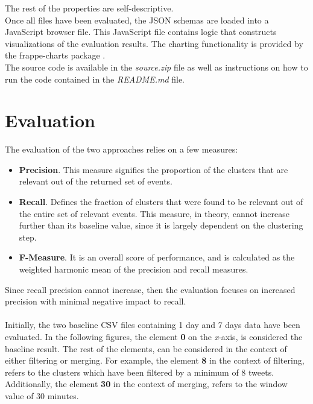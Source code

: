 \documentclass[a4paper,portrait,12pt]{article}
\begin{document}
The rest of the properties are self-descriptive.\\

Once all files have been evaluated, the JSON schemas are loaded into a JavaScript browser file.
This JavaScript file contains logic that constructs visualizations of the evaluation results.
The charting functionality is provided by the frappe-charts package \cite{frappeCharts}.\\

The source code is available in the \textit{source.zip} file as well as instructions on how to run the code contained in the \textit{README.md} file.

\section{Evaluation}
\label{section-eval}

The evaluation of the two approaches relies on a few measures:
\begin{itemize}
	\item \textbf{Precision}.
	      This measure signifies the proportion of the clusters that are relevant out of the returned set of events.
	\item \textbf{Recall}.
	      Defines the fraction of clusters that were found to be relevant out of the entire set of relevant events.
	      This measure, in theory, cannot increase further than its baseline value, since it is largely dependent on the clustering step.
	\item \textbf{F-Measure}.
	      It is an overall score of performance, and is calculated as the weighted harmonic mean of the precision and recall measures.
\end{itemize}

Since recall precision cannot increase, then the evaluation focuses on increased precision with minimal negative impact to recall.\\
\\
Initially, the two baseline CSV files containing 1 day and 7 days data have been evaluated.
In the following figures, the element \textbf{0} on the \textit{x}-axis, is considered the baseline result.
The rest of the elements, can be considered in the context of either filtering or merging.
For example, the element \textbf{8} in the context of filtering, refers to the clusters which have been filtered by a minimum of 8 tweets.
Additionally, the element \textbf{30} in the context of merging, refers to the window value of 30 minutes.
\end{document}
